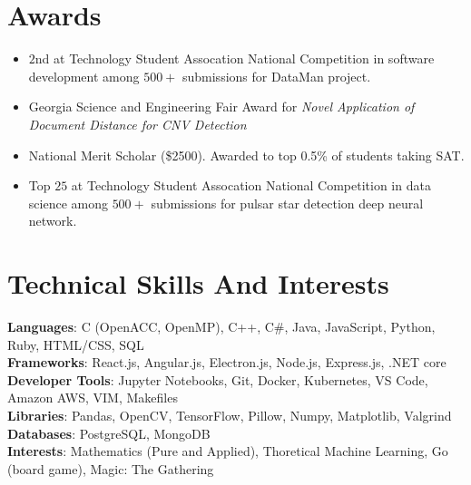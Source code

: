 \documentclass[letterpaper,10pt]{article}
\newcommand{\resumeItem}[1]{

  \item[$\circ$]\small{
    {#1 \vspace{-2pt}}
  }
}
\newcommand{\resumeItemListStart}{\begin{itemize}[rightmargin=1.9cm]}
\newcommand{\resumeItemListEnd}{\end{itemize}\vspace{-5pt}}
\begin{document}
\section{Awards}
\resumeItemListStart
\resumeItem{$2$nd at Technology Student Assocation National Competition in software development among $500+$ submissions for DataMan project.}
\vspace{-5pt}
\resumeItem{Georgia Science and Engineering Fair Award for \textit{Novel Application of Document Distance for CNV Detection}}
\vspace{-5pt}
\resumeItem{National Merit Scholar (\$2500). Awarded to top 0.5\% of students taking SAT.}
\vspace{-5pt}
\resumeItem{Top $25$ at Technology Student Assocation National Competition in data science among $500+$ submissions for pulsar star detection deep neural network.}
\vspace{-5pt}\resumeItemListEnd

\section{Technical Skills And Interests}
\begin{itemize}[leftmargin=0.15in, label={}]
  \small{\item{
                \textbf{Languages}{: C (OpenACC, OpenMP), C++, C\#, Java, JavaScript, Python, Ruby, HTML/CSS, SQL}\\
                \textbf{Frameworks}{: React.js, Angular.js, Electron.js, Node.js, Express.js, .NET core} \\
                \textbf{Developer Tools}{: Jupyter Notebooks, Git, Docker, Kubernetes, VS Code, Amazon AWS, VIM, Makefiles} \\
                \textbf{Libraries}{: Pandas, OpenCV, TensorFlow, Pillow, Numpy, Matplotlib, Valgrind}\\
                \textbf{Databases}{: PostgreSQL, MongoDB}\\
                \textbf{Interests}{: Mathematics (Pure and Applied), Thoretical Machine Learning, Go (board game), Magic: The Gathering\\
                }}}
\end{itemize}
\end{document}
